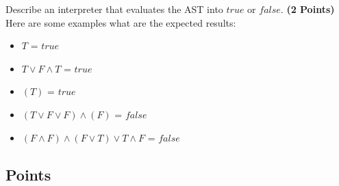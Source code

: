\documentclass [11pt, a4wide, twoside]{article}
\begin{document}
\begin{myenumerate}
\item Describe an interpreter that evaluates the AST into $true$ or $false$. \textbf{(2 Points)}
\\Here are some examples what are the expected results:
\begin{itemize}
	\item $T$
		= $true$
	\item $T \lor F \land T$
		= $true$
	\item $(T)$
		= $true$
	\item $(T \lor F \lor F) \land (F)$
		= $false$
	\item $(F \land F) \land (F \lor T) \lor T \land F$
		= $false$
\end{itemize}
\vspace{3.8cm}

\end{myenumerate}

\begin{comment}
\begin{verbatim}
apply visitor

bit -> true, false
and -> left.evaluate() && right.evaluate()
or -> left.evaluate() || right.evaluate()
\end{verbatim}
\end{comment}

\newpage
\subsection*{Points}
\end{document}
